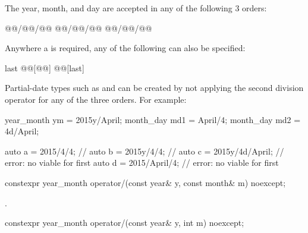 \pnum
\begin{note}
The year, month, and day are accepted in any of the following 3 orders:

\begin{codeblock}
@@/@@/@@
@@/@@/@@
@@/@@/@@
\end{codeblock}

Anywhere a  is required, any of the following can also be specified:

\begin{codeblock}
last
@@[@@]
@@[last]
\end{codeblock}
\end{note}

\pnum
\begin{note}
Partial-date types such as  and 
can be created by not applying the second division operator
for any of the three orders. For example:

\begin{codeblock}
year_month ym = 2015y/April;
month_day md1 = April/4;
month_day md2 = 4d/April;
\end{codeblock}
\end{note}

\pnum
\begin{example}
\begin{codeblock}
auto a = 2015/4/4;         // 
auto b = 2015y/4/4;        // 
auto c = 2015y/4d/April;   // error: no viable  for first \tcode{/}
auto d = 2015/April/4;     // error: no viable  for first \tcode{/}
\end{codeblock}
\end{example}

\begin{itemdecl}
constexpr year_month
  operator/(const year& y, const month& m) noexcept;
\end{itemdecl}

\begin{itemdescr}
\pnum
\returns {}.
\end{itemdescr}

\begin{itemdecl}
constexpr year_month
  operator/(const year& y, int   m) noexcept;
\end{itemdecl}

